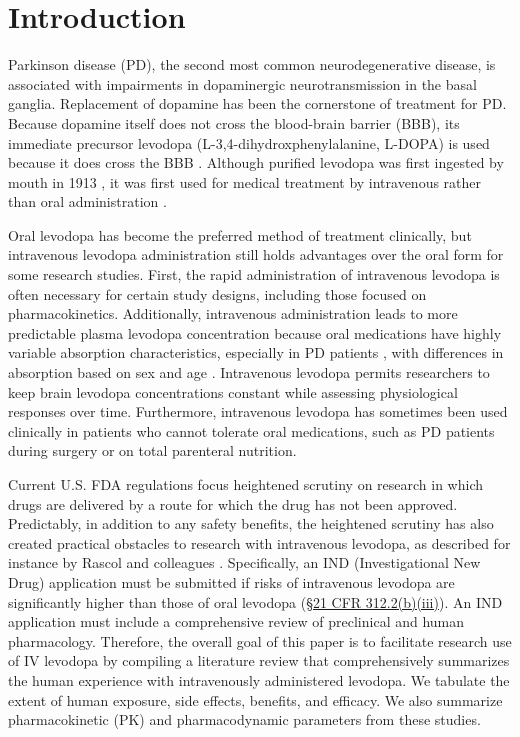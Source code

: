\section{Introduction}
Parkinson disease (PD), the second most common neurodegenerative disease, is associated with impairments in dopaminergic neurotransmission in the basal ganglia. Replacement of dopamine has been the cornerstone of treatment for PD. Because dopamine itself does not cross the blood-brain barrier (BBB), its immediate precursor levodopa (L-3,4-dihydroxphenylalanine, L-DOPA) is used because it does cross the BBB \cite{11763859,13954967,5334614}. Although purified levodopa was first ingested by mouth in 1913 \cite{Roe_1997}, it was first used for medical treatment by intravenous rather than oral administration \cite{14430381,11763859}.
	
Oral levodopa has become the preferred method of treatment clinically, but intravenous levodopa administration still holds advantages over the oral form for some research studies.  First, the rapid administration of intravenous levodopa is often necessary for certain study designs, including those focused on pharmacokinetics.  Additionally, intravenous administration leads to more predictable plasma levodopa concentration because oral medications have highly variable absorption characteristics, especially in PD patients \cite{2797454}, with differences in absorption based on sex and age \cite{2775615,12011296}.  Intravenous levodopa permits researchers to keep brain levodopa concentrations constant while assessing physiological responses over time.  Furthermore, intravenous levodopa has sometimes been used clinically in patients who cannot tolerate oral medications, such as PD patients during surgery or on total parenteral nutrition.  

Current U.S. FDA regulations focus heightened scrutiny on research in which drugs are delivered by a route for which the drug has not been approved. Predictably, in addition to any safety benefits, the heightened scrutiny has also created practical obstacles to research with intravenous levodopa, as described for instance by Rascol and colleagues \cite[p. 250]{11176963}.  Specifically, an IND (Investigational New Drug) application must be submitted if risks of intravenous levodopa are significantly higher than those of oral levodopa (\href{http://www.accessdata.fda.gov/scripts/cdrh/cfdocs/cfcfr/CFRSearch.cfm?fr=312.2}{\S 21 CFR 312.2(b)(iii)}). An IND application must include a comprehensive review of preclinical and human pharmacology. Therefore, the overall goal of this paper is to facilitate research use of IV levodopa by compiling a literature review that comprehensively summarizes the human experience with intravenously administered levodopa.  We tabulate the extent of human exposure, side effects, benefits, and efficacy.  We also summarize pharmacokinetic (PK) and pharmacodynamic parameters from these studies. 
